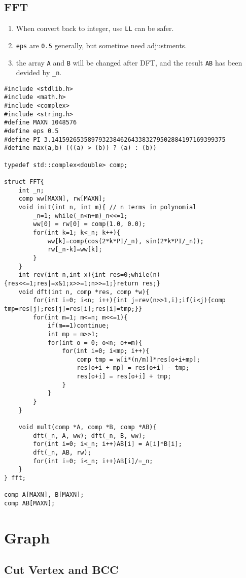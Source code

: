 \subsection{FFT}
\begin{enumerate}
\itemsep-0.5em
\item When convert back to integer, use \lstinline{LL} can be safer.
\item \lstinline{eps} are \lstinline{0.5} generally, but sometime need adjustments.
\item the array \lstinline{A} and \lstinline{B} will be changed after DFT, and the result \lstinline{AB} has been devided by \lstinline{_n}.
\end{enumerate}
\begin{lstlisting}
#include <stdlib.h>
#include <math.h>
#include <complex>
#include <string.h>
#define MAXN 1048576
#define eps 0.5
#define PI 3.141592653589793238462643383279502884197169399375
#define max(a,b) (((a) > (b)) ? (a) : (b))

typedef std::complex<double> comp;

struct FFT{
	int _n;
	comp ww[MAXN], rw[MAXN];
	void init(int n, int m){ // n terms in polynomial
		_n=1; while(_n<n+m)_n<<=1;
		ww[0] = rw[0] = comp(1.0, 0.0);
		for(int k=1; k<_n; k++){
			ww[k]=comp(cos(2*k*PI/_n), sin(2*k*PI/_n));
			rw[_n-k]=ww[k];
		}
	}
	int rev(int n,int x){int res=0;while(n){res<<=1;res|=x&1;x>>=1;n>>=1;}return res;}
	void dft(int n, comp *res, comp *w){
		for(int i=0; i<n; i++){int j=rev(n>>1,i);if(i<j){comp tmp=res[j];res[j]=res[i];res[i]=tmp;}}
		for(int m=1; m<=n; m<<=1){ 
			if(m==1)continue;
			int mp = m>>1;
			for(int o = 0; o<n; o+=m){
				for(int i=0; i<mp; i++){
					comp tmp = w[i*(n/m)]*res[o+i+mp];
					res[o+i + mp] = res[o+i] - tmp;
					res[o+i] = res[o+i] + tmp;
				}
			}
		}
	}

	void mult(comp *A, comp *B, comp *AB){
		dft(_n, A, ww); dft(_n, B, ww);
		for(int i=0; i<_n; i++)AB[i] = A[i]*B[i];
		dft(_n, AB, rw);
		for(int i=0; i<_n; i++)AB[i]/=_n;
	}
} fft;

comp A[MAXN], B[MAXN];
comp AB[MAXN];
\end{lstlisting}
\section{Graph}
\subsection{Cut Vertex and BCC}
